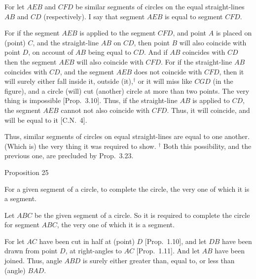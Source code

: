 \epsfysize=2.4in
\centerline{}

For let $AEB$ and $CFD$ be similar segments of circles on the equal straight-lines $AB$ and $CD$ (respectively). I say that segment $AEB$ is equal to segment
$CFD$.

For if the segment $AEB$ is applied to the segment $CFD$,  and point $A$
is placed on (point) $C$, and the straight-line $AB$ on $CD$, then point $B$ will also coincide with point $D$, on account of $AB$ being equal to $CD$. And
if $AB$ coincides with $CD$ then the segment $AEB$ will also coincide with $CFD$.
For if the straight-line $AB$ coincides with $CD$, and the segment $AEB$ does not
coincide with $CFD$, then it will surely either fall inside it, outside (it),$^\dag$ or
it will miss like $CGD$ (in the figure), and a circle (will) cut (another) circle
at more than two points. The very thing is impossible [Prop.~3.10].
Thus, if the straight-line $AB$ is applied to $CD$, the segment $AEB$ cannot
not also coincide with $CFD$. Thus, it will coincide, and will be equal to it [C.N.~4].

Thus, similar segments of circles on equal straight-lines are equal to one another. (Which is) the very thing it was required to show.
{\footnotesize \noindent$^\dag$ Both this possibility, and the previous one, are precluded by Prop.~3.23.}


\begin{center}
{\large Proposition 25}
\end{center}

For a given segment of a circle, to complete the circle, the very one of which it is a segment.

\epsfysize=1.3in
\centerline{}

Let $ABC$ be the given segment of a circle. So it is required
to complete the circle for segment $ABC$, the very one of which it is a segment.

For let $AC$ have been cut in half at (point) $D$ [Prop.~1.10], and let $DB$ have been drawn
from point $D$, at right-angles to $AC$ [Prop.~1.11]. And let $AB$ have been joined.
Thus, angle $ABD$ is surely either greater than,  equal to, or less than (angle)
$BAD$.

